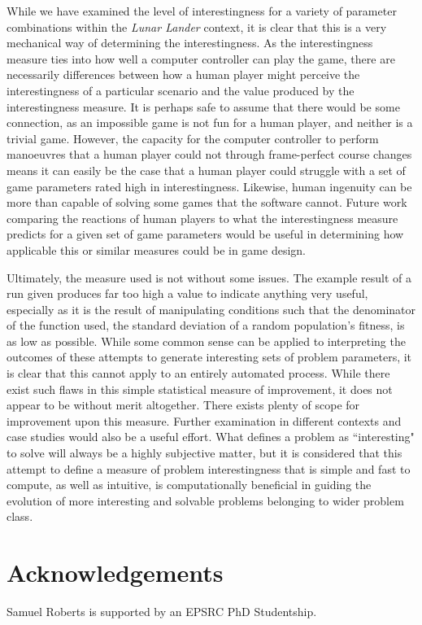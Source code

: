 \documentclass[conference]{IEEEtran}
\begin{document}
While we have examined the level of interestingness for a variety of parameter combinations within the {\itshape Lunar Lander} context, it is clear that this is a very mechanical way of determining the interestingness. As the interestingness measure ties into how well a computer controller can play the game, there are necessarily differences between how a human player might perceive the interestingness of a particular scenario and the value produced by the interestingness measure. It is perhaps safe to assume that there would be some connection, as an impossible game is not fun for a human player, and neither is a trivial game. However, the capacity for the computer controller to perform manoeuvres that a human player could not through frame-perfect course changes means it can easily be the case that a human player could struggle with a set of game parameters rated high in interestingness. Likewise, human ingenuity can be more than capable of solving some games that the software cannot. Future work comparing the reactions of human players to what the interestingness measure predicts for a given set of game parameters would be useful in determining how applicable this or similar measures could be in game design.

Ultimately, the measure used is not without some issues. The example result of a run given produces far too high a value to indicate anything very useful, especially as it is the result of manipulating conditions such that the denominator of the function used, the standard deviation of a random population's fitness, is as low as possible. While some common sense can be applied to interpreting the outcomes of these attempts to generate interesting sets of problem parameters, it is clear that this cannot apply to an entirely automated process. While there exist such flaws in this simple statistical measure of improvement, it does not appear to be without merit altogether. There exists plenty of scope for improvement upon this measure.  Further examination in different contexts and case studies would also be a useful effort. What defines a problem as ``interesting" to solve will always be a highly subjective matter, but it is considered that this attempt to define a measure of problem interestingness that is simple and fast to compute, as well as intuitive, is computationally beneficial in guiding the evolution of more interesting and solvable problems belonging to wider problem class.
 
\section*{Acknowledgements}
Samuel Roberts is supported by an EPSRC PhD Studentship.




\end{document}
